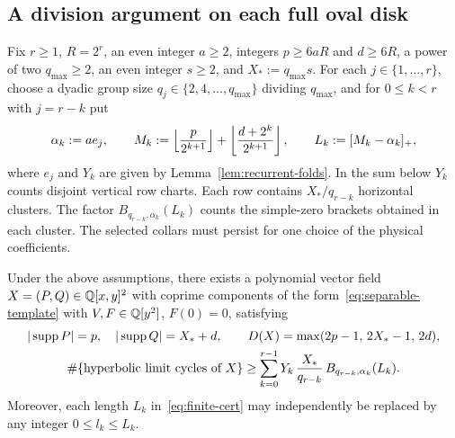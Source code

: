 \subsection{A division argument on each full oval disk}

Fix $r\ge 1$, $R=2^r$, an even integer $a\ge 2$, integers $p\ge 6aR$ and $d\ge 6R$, a power of two $q_{\max}\ge 2$, an even integer $s\ge 2$, and $X_*:=q_{\max} s$. For each $j\in\{1,\dots,r\}$, choose a dyadic group size $q_j\in\{2,4,\dots,q_{\max}\}$ dividing $q_{\max}$, and for $0\le k<r$ with $j=r-k$ put
\begin{equation}\label{eq:folded-stage-modes}
  \alpha_k := a e_j, \qquad
  M_k := \left\lfloor\frac{p}{2^{k+1}}\right\rfloor + \left\lfloor\frac{d+2^k}{2^{k+1}}\right\rfloor, \qquad
  L_k := [M_k - \alpha_k]_+,
\end{equation}
where $e_j$ and $Y_k$ are given by Lemma~\ref{lem:recurrent-folds}. In the sum below \(Y_k\) counts disjoint vertical row charts. Each row contains \(X_*/q_{r-k}\) horizontal clusters. The factor \(B_{q_{r-k},\alpha_k}(L_k)\) counts the simple-zero brackets obtained in each cluster. The selected collars must persist for one choice of the physical coefficients.
\begin{theorem}\label{thm:finite-folded}
Under the above assumptions, there exists a polynomial vector field $X=(P,Q)\in\mathbb{Q}[x,y]^2$ with coprime components of the form~\eqref{eq:separable-template} with $V,F\in\mathbb{Q}[y^2]$, $F(0)=0$, satisfying
\begin{gather}
  |\operatorname{supp} P| = p,\quad |\operatorname{supp} Q| = X_*+d, \qquad
  D(X) = \max(2p-1,\,2X_*-1,\,2d), \label{eq:finite-ledger} \\
  \#\{\text{hyperbolic limit cycles of } X\} \ge \sum_{k=0}^{r-1} Y_k\,\frac{X_*}{q_{r-k}}\,B_{q_{r-k},\alpha_k}(L_k). \label{eq:finite-cert}
\end{gather}
Moreover, each length $L_k$ in~\eqref{eq:finite-cert} may independently be replaced by any integer $0\le l_k\le L_k$.
\end{theorem}

